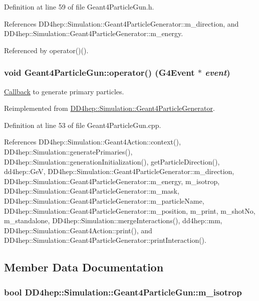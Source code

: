 Definition at line 59 of file Geant4ParticleGun.h.

References DD4hep::Simulation::Geant4ParticleGenerator::m\_\-direction, and DD4hep::Simulation::Geant4ParticleGenerator::m\_\-energy.

Referenced by operator()().\hypertarget{class_d_d4hep_1_1_simulation_1_1_geant4_particle_gun_a4e68905424d21f2386d24d3cbaf795f1}{
\subsubsection[{operator()}]{\setlength{\rightskip}{0pt plus 5cm}void Geant4ParticleGun::operator() (G4Event $\ast$ {\em event})}}
\label{class_d_d4hep_1_1_simulation_1_1_geant4_particle_gun_a4e68905424d21f2386d24d3cbaf795f1}


\hyperlink{class_d_d4hep_1_1_callback}{Callback} to generate primary particles. 

Reimplemented from \hyperlink{class_d_d4hep_1_1_simulation_1_1_geant4_particle_generator_a4b7c8fdbc6fdc0c79efdf112c8ede315}{DD4hep::Simulation::Geant4ParticleGenerator}.

Definition at line 53 of file Geant4ParticleGun.cpp.

References DD4hep::Simulation::Geant4Action::context(), DD4hep::Simulation::generatePrimaries(), DD4hep::Simulation::generationInitialization(), getParticleDirection(), dd4hep::GeV, DD4hep::Simulation::Geant4ParticleGenerator::m\_\-direction, DD4hep::Simulation::Geant4ParticleGenerator::m\_\-energy, m\_\-isotrop, DD4hep::Simulation::Geant4ParticleGenerator::m\_\-mask, DD4hep::Simulation::Geant4ParticleGenerator::m\_\-particleName, DD4hep::Simulation::Geant4ParticleGenerator::m\_\-position, m\_\-print, m\_\-shotNo, m\_\-standalone, DD4hep::Simulation::mergeInteractions(), dd4hep::mm, DD4hep::Simulation::Geant4Action::print(), and DD4hep::Simulation::Geant4ParticleGenerator::printInteraction().

\subsection{Member Data Documentation}
\hypertarget{class_d_d4hep_1_1_simulation_1_1_geant4_particle_gun_aba05dc63eaf9a7f7d06932d9f66eb154}{
\subsubsection[{m\_\-isotrop}]{\setlength{\rightskip}{0pt plus 5cm}bool {\bf DD4hep::Simulation::Geant4ParticleGun::m\_\-isotrop}}}
\label{class_d_d4hep_1_1_simulation_1_1_geant4_particle_gun_aba05dc63eaf9a7f7d06932d9f66eb154}


